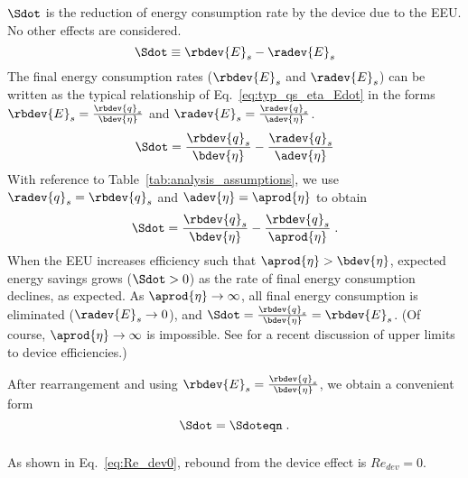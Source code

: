 $\Sdot$ is the reduction of energy consumption rate
by the device due to the EEU.
No other effects are considered.
%
\begin{equation}
  \Sdot \equiv \rbdev{E}_s - \radev{E}_s
\end{equation}
%
The final energy consumption rates ($\rbdev{E}_s$ and $\radev{E}_s$) 
can be written as the typical relationship of Eq.~\ref{eq:typ_qs_eta_Edot} in the forms
$\rbdev{E}_s = \frac{\rbdev{q}_s}{\bdev{\eta}}$ and 
$\radev{E}_s = \frac{\radev{q}_s}{\adev{\eta}}$. 
%
\begin{equation}
  \Sdot = \frac{\rbdev{q}_s}{\bdev{\eta}} - \frac{\radev{q}_s}{\adev{\eta}}
\end{equation}
%
With reference to Table~\ref{tab:analysis_assumptions}, 
we use $\radev{q}_s = \rbdev{q}_s$ and $\adev{\eta} = \aprod{\eta}$ to obtain
%
\begin{equation}
  \Sdot = \frac{\rbdev{q}_s}{\bdev{\eta}} - \frac{\rbdev{q}_s}{\aprod{\eta}} \; .
\end{equation}
%
When the EEU increases efficiency such that $\aprod{\eta} > \bdev{\eta}$,
expected energy savings grows ($\Sdot > 0$)
as the rate of final energy consumption declines,
as expected.
As $\aprod{\eta} \rightarrow \infty$,
all final energy consumption is eliminated ($\radev{E}_s \rightarrow 0$), and
$\Sdot = \frac{\rbdev{q}_s}{\bdev{\eta}} = \rbdev{E}_s$.
(Of course, $\aprod{\eta} \rightarrow \infty$ is impossible. 
See \citet{Paoli:2020aa} for a recent discussion of upper limits to device efficiencies.)

After rearrangement and using $\rbdev{E}_s = \frac{\rbdev{q}_s}{\bdev{\eta}}$, 
we obtain a convenient form
%
\begin{equation} \label{eq:Sdot}
  \Sdot = \Sdoteqn \; .
\end{equation}


\subsubsection{\Deveffect} 
\label{sec:Re_dev}

As shown in Eq.~\ref{eq:Re_dev0}, 
rebound from the device effect is $Re_{dev} = 0$.


\subsubsection{\Lceffect{}} 
\label{sec:Re_lc}

